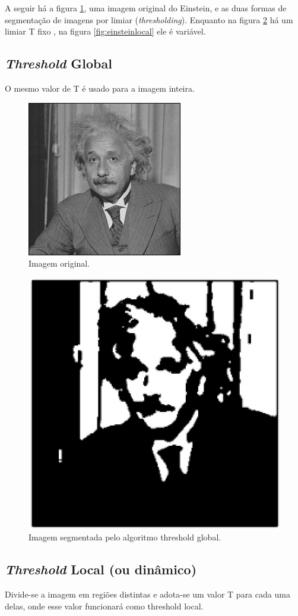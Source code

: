 A seguir há a figura \ref{fig:einstein}, uma imagem original do Einstein,  e as duas formas de segmentação de imagens por limiar (\textit{thresholding}). Enquanto na figura \ref{fig:einsteinglobal} há um limiar T fixo , na  figura \ref{fig:einsteinlocal} ele é variável.

\subsection*{\textit{Threshold} Global}
O mesmo valor de T é usado para a imagem inteira.

  \begin{figure}[!htb]
       \begin{center}  
          \includegraphics[width=0.3\columnwidth]{img/einstein.jpg}
           \caption{\label{fig:einstein}Imagem original\citep{stanford}.}
       \end{center}
   \end{figure}

  \begin{figure}[!htb]
       \begin{center}  
          \includegraphics[width=0.3\columnwidth]{img/einstein-globalthresholding127.jpg}
           \caption{\label{fig:einsteinglobal}Imagem segmentada pelo algoritmo threshold global.}
       \end{center}
   \end{figure}

\subsection*{\textit{Threshold} Local (ou dinâmico)}
Divide-se a imagem em regiões distintas e adota-se um valor T para cada uma delas, onde esse valor funcionará como threshold local. 


